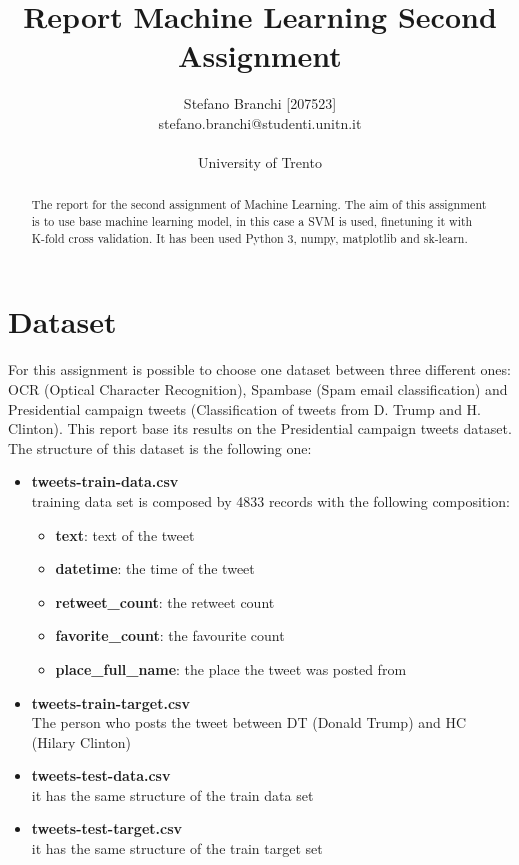 \documentclass{article}
\title{Report Machine Learning Second Assignment}
\author{Stefano Branchi [207523] \\ stefano.branchi@studenti.unitn.it \\\\ University of Trento}
\date{}
\begin{document}
\maketitle
\begin{abstract}
    The report for the second assignment of Machine Learning. The aim of this assignment is to use base machine learning model, in this case a SVM is used, finetuning it with K-fold cross validation. It has been used Python 3, numpy, matplotlib and sk-learn.
\end{abstract}

\section{Dataset}
For this assignment is possible to choose one dataset between three different ones: OCR (Optical Character Recognition), Spambase (Spam email classification) and Presidential campaign tweets (Classification of tweets from D. Trump and H. Clinton). This report base its results on the Presidential campaign tweets dataset.\\
The structure of this dataset is the following one:
\begin{itemize}
  \item \textbf{tweets-train-data.csv}\\ training data set is composed by 4833 records with the following composition:
  \begin{itemize}
      \item \textbf{text}: text of the tweet
      \item \textbf{datetime}: the time of the tweet
      \item \textbf{retweet\_count}: the retweet count
      \item \textbf{favorite\_count}: the favourite count
      \item \textbf{place\_full\_name}: the place the tweet was posted from
  \end{itemize}
  \item \textbf{tweets-train-target.csv} \\ The person who posts the tweet between DT (Donald Trump) and HC (Hilary Clinton)
  \item \textbf{tweets-test-data.csv} \\ it has the same structure of the train data set
  \item \textbf{tweets-test-target.csv} \\ it has the same structure of the train target set
\end{itemize}
\end{document}
